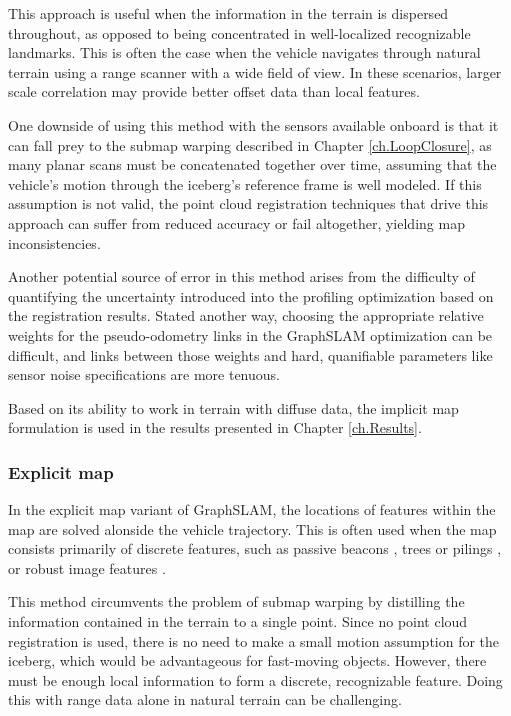This approach is useful when the information in the terrain is dispersed throughout, as opposed to being concentrated in well-localized recognizable landmarks. This is often the case when the vehicle navigates through natural terrain using a range scanner with a wide field of view. In these scenarios, larger scale correlation may provide better offset data than local features. 

One downside of using this method with the sensors available onboard is that it can fall prey to the submap warping described in Chapter \ref{ch.LoopClosure}, as many planar scans must be concatenated together over time, assuming that the vehicle's motion through the iceberg's reference frame is well modeled. If this assumption is not valid, the point cloud registration techniques that drive this approach can suffer from reduced accuracy or fail altogether, yielding map inconsistencies. 

Another potential source of error in this method arises from the difficulty of quantifying the uncertainty introduced into the profiling optimization based on the registration results. Stated another way, choosing the appropriate relative weights for the pseudo-odometry links in the GraphSLAM optimization can be difficult, and links between those weights and hard, quanifiable parameters like sensor noise specifications are more tenuous.  

Based on its ability to work in terrain with diffuse data, the implicit map formulation is used in the results presented in Chapter \ref{ch.Results}.


\subsubsection{Explicit map} 

In the explicit map variant of GraphSLAM, the locations of features within the map are solved alonside the vehicle trajectory. This is often used when the map consists primarily of discrete features, such as passive beacons \cite{?}, trees or pilings \cite{Langellaan}, or robust image features \cite{Augenstein}.

This method circumvents the problem of submap warping by distilling the information contained in the terrain to a single point. Since no point cloud registration is used, there is no need to make a small motion assumption for the iceberg, which  would be advantageous for fast-moving objects. However, there must be enough local information to form a discrete, recognizable feature. Doing this with range data alone in natural terrain can be challenging. 

